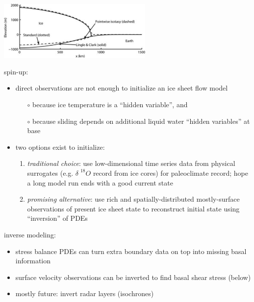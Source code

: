 \documentclass[titlepage,letterpaper,final,11pt]{scrartcl}
\begin{document}
\begin{center}
  \includegraphics[width=3.0in]{earthcompare}
\end{center}

spin-up:

\begin{itemize}
\item direct observations are not enough to initialize an ice sheet flow model
  \begin{itemize}
  \item[$\circ$] because ice temperature is a ``hidden variable'', and
  \item[$\circ$] because sliding depends on additional liquid water ``hidden variables'' at base
  \end{itemize}
\item two options exist to initialize:
  \small
  \begin{enumerate}
  \item \emph{traditional choice}: use low-dimensional time series data from physical surrogates (e.g. $\delta \phantom{|}^{18}O$ record from ice cores) for paleoclimate record; hope a long model run ends with a good current state
  \item \emph{promising alternative}:  use rich and spatially-distributed mostly-surface observations of present ice sheet state to reconstruct initial state using ``inversion'' of PDEs
  \normalsize
  \end{enumerate}
\end{itemize}

inverse modeling:

\begin{itemize}
\item stress balance PDEs can turn extra boundary data on top into missing basal information
\item surface velocity observations can be inverted to find basal shear stress (below)
\item mostly future: invert radar layers (isochrones)
\end{itemize}
\end{document}
